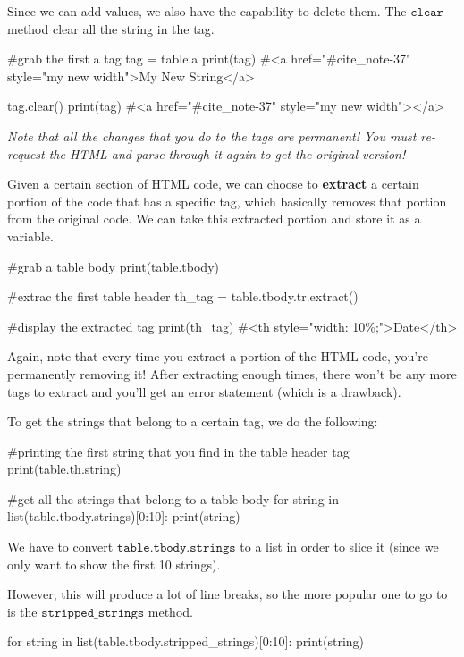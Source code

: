 \documentclass{article}
\begin{document}
  Since we can add values, we also have the capability to delete them. The $\texttt{clear}$ method clear all the string in the tag. 
  \begin{python}
  #grab the first a tag
  tag = table.a
  print(tag)
  #<a href="#cite_note-37" style="my new width">My New String</a>

  tag.clear()
  print(tag)
  #<a href="#cite_note-37" style="my new width"></a>
  \end{python}

  \textit{Note that all the changes that you do to the tags are permanent! You must re-request the HTML and parse through it again to get the original version!}

  \begin{definition}
  Given a certain section of HTML code, we can choose to \textbf{extract} a certain portion of the code that has a specific tag, which basically removes that portion from the original code. We can take this extracted portion and store it as a variable.
  \begin{python}
  #grab a table body
  print(table.tbody)

  #extrac the first table header 
  th_tag = table.tbody.tr.extract()

  #display the extracted tag
  print(th_tag)
  #<th style="width: 10\%;">Date</th>
  \end{python}
  Again, note that every time you extract a portion of the HTML code, you're permanently removing it! After extracting enough times, there won't be any more tags to extract and you'll get an error statement (which is a drawback). 
  \end{definition}

  \begin{definition}
  To get the strings that belong to a certain tag, we do the following: 
  \begin{python}
  #printing the first string that you find in the table header tag
  print(table.th.string)  

  #get all the strings that belong to a table body
  for string in list(table.tbody.strings)[0:10]: 
      print(string)
  \end{python}
  We have to convert $\texttt{table.tbody.strings}$ to a list in order to slice it (since we only want to show the first 10 strings). 

  However, this will produce a lot of line breaks, so the more popular one to go to is the $\texttt{stripped\_strings}$ method. 
  \begin{python}
  for string in list(table.tbody.stripped_strings)[0:10]: 
      print(string)
  \end{python}
  \end{definition}
\end{document}
